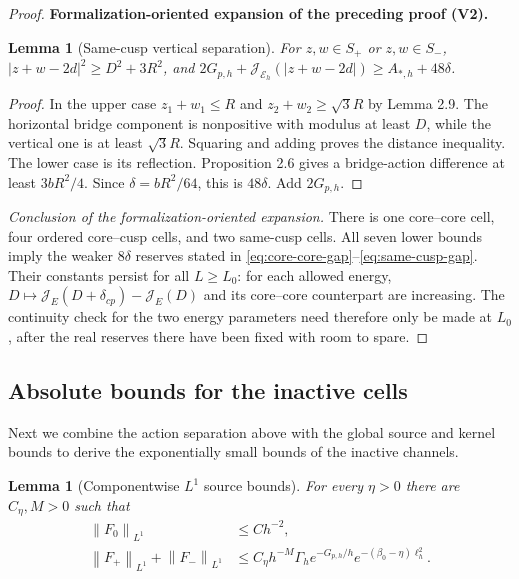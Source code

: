 \documentclass[11pt]{article}
\newtheorem{lemma}[theorem]{Lemma}
\newcommand{\formalisationparentid}{X}
\newenvironment{formalisationaddition}[1]{\par\medskip\begingroup\color{blue}\def\formalisationparentid{#1}\setcounter{formalizationsublemma}{0}\let\lemma\formalizationsublemma\let\endlemma\endformalizationsublemma
  \def\Eo{\mathcal E_h^\circ}\def\EE{\mathcal E_h}\def\phio{\phi_h^\circ}\def\phih{\phi_h}\def\Ho{H_h^{\rm atom}(v^\circ)}\def\Ha{H_h^{\rm atom}}\def\HL{H_h^{L}}\def\Dh{D_h}\def\Log{\operatorname{Log}}\def\ellh{\ell_h}\def\Gp{G_{p,h}}\def\Ast{A_{*,h}}\def\ahat{\widehat{\mathfrak a}_h}\def\ah{\mathfrak a_h}\def\rh{\widehat\rho_h}\def\deltah{\widehat\delta_h}\def\oldref##1{\textup{(##1)}}\def\interface##1{\par\noindent\textit{Analytical interface used here.} ##1\par}\def\finish{\par\noindent\textit{Conclusion of the formalization-oriented expansion.} }\par\noindent\textbf{Formalization-oriented expansion of the preceding proof (V2).}\par\smallskip
}{\par\endgroup\medskip
}
\newcommand{\cJ}{\mathcal J}
\newcommand{\norm}[1]{\left\|#1\right\|}
\begin{document}
\begin{proof}
\begin{formalisationaddition}{T5.5}
\begin{lemma}[Same-cusp vertical separation]\label{sublemma:T5-5-same-cusp}
For $z,w\in S_+$ or $z,w\in S_-$,
$|z+w-2d|^2\ge D^2+3R^2$, and
$2G_{p,h}+\cJ_{\mathcal E_h}(|z+w-2d|)\ge A_{*,h}+48\delta$.
\end{lemma}
\begin{proof}
In the upper case $z_1+w_1\le R$ and $z_2+w_2\ge\sqrt3R$ by Lemma 2.9. The horizontal bridge component is nonpositive with modulus at least $D$, while the vertical one is at least $\sqrt3R$. Squaring and adding proves the distance inequality. The lower case is its reflection. Proposition 2.6 gives a bridge-action difference at least $3bR^2/4$. Since $\delta=bR^2/64$, this is $48\delta$. Add $2G_{p,h}$.
\end{proof}
\finish There is one core--core cell, four ordered core--cusp cells, and two same-cusp cells. All seven lower bounds imply the weaker $8\delta$ reserves stated in \eqref{eq:core-core-gap}--\eqref{eq:same-cusp-gap}. Their constants persist for all $L\ge L_0$: for each allowed energy, $D\mapsto \cJ_E(D+\delta_{cp})-\cJ_E(D)$ and its core--core counterpart are increasing. The continuity check for the two energy parameters need therefore only be made at $L_0$, after the real reserves there have been fixed with room to spare.
\end{formalisationaddition}

\end{proof}

\subsection{Absolute bounds for the inactive cells}
Next we combine the action separation above with the global source and kernel bounds to derive the exponentially small bounds of the inactive channels.
\begin{lemma}[Componentwise $L^1$ source bounds]
\label{lem:component-source-L1}
For every $\eta>0$ there are $C_\eta,M>0$ such that
\begin{align}
 \norm{F_0}_{L^1}&\le Ch^{-2},\label{eq:F0-L1}\\
 \norm{F_+}_{L^1}+\norm{F_-}_{L^1}
 &\le C_\eta h^{-M}\Gamma_he^{-G_{p,h}/h}
 e^{-(\beta_0-\eta)\ell_h^2}.
 \label{eq:Fcusp-L1}
\end{align}
\end{lemma}
\end{document}
